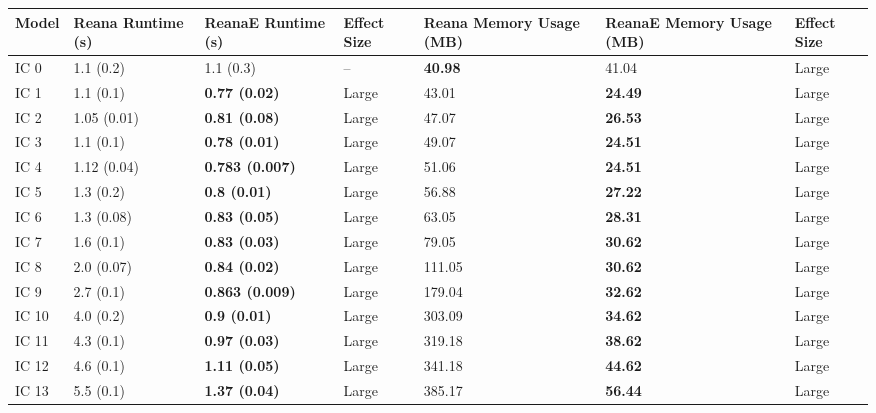 \begin{tabular}{lllllll}
\toprule
Model & Reana Runtime (s) &     ReanaE Runtime (s) & Effect Size & Reana Memory Usage (MB) & ReanaE Memory Usage (MB) & Effect Size \\
\midrule
 IC 0 &         1.1 (0.2) &              1.1 (0.3) &          -- &          \textbf{40.98} &                    41.04 &       Large \\
 IC 1 &         1.1 (0.1) &   \textbf{0.77 (0.02)} &       Large &                   43.01 &           \textbf{24.49} &       Large \\
 IC 2 &       1.05 (0.01) &   \textbf{0.81 (0.08)} &       Large &                   47.07 &           \textbf{26.53} &       Large \\
 IC 3 &         1.1 (0.1) &   \textbf{0.78 (0.01)} &       Large &                   49.07 &           \textbf{24.51} &       Large \\
 IC 4 &       1.12 (0.04) & \textbf{0.783 (0.007)} &       Large &                   51.06 &           \textbf{24.51} &       Large \\
 IC 5 &         1.3 (0.2) &    \textbf{0.8 (0.01)} &       Large &                   56.88 &           \textbf{27.22} &       Large \\
 IC 6 &        1.3 (0.08) &   \textbf{0.83 (0.05)} &       Large &                   63.05 &           \textbf{28.31} &       Large \\
 IC 7 &         1.6 (0.1) &   \textbf{0.83 (0.03)} &       Large &                   79.05 &           \textbf{30.62} &       Large \\
 IC 8 &        2.0 (0.07) &   \textbf{0.84 (0.02)} &       Large &                  111.05 &           \textbf{30.62} &       Large \\
 IC 9 &         2.7 (0.1) & \textbf{0.863 (0.009)} &       Large &                  179.04 &           \textbf{32.62} &       Large \\
IC 10 &         4.0 (0.2) &    \textbf{0.9 (0.01)} &       Large &                  303.09 &           \textbf{34.62} &       Large \\
IC 11 &         4.3 (0.1) &   \textbf{0.97 (0.03)} &       Large &                  319.18 &           \textbf{38.62} &       Large \\
IC 12 &         4.6 (0.1) &   \textbf{1.11 (0.05)} &       Large &                  341.18 &           \textbf{44.62} &       Large \\
IC 13 &         5.5 (0.1) &   \textbf{1.37 (0.04)} &       Large &                  385.17 &           \textbf{56.44} &       Large \\

\end{tabular}

